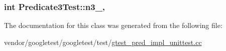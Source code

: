 \subsubsection[{\texorpdfstring{n3\+\_\+}{n3_}}]{\setlength{\rightskip}{0pt plus 5cm}int Predicate3\+Test\+::n3\+\_\+\hspace{0.3cm}{\ttfamily [static]}, {\ttfamily [protected]}}\hypertarget{classPredicate3Test_afc1df6b079ffe22b87479b161d2ad2f7}{}\label{classPredicate3Test_afc1df6b079ffe22b87479b161d2ad2f7}


The documentation for this class was generated from the following file\+:\begin{DoxyCompactItemize}
\item 
vendor/googletest/googletest/test/\hyperlink{gtest__pred__impl__unittest_8cc}{gtest\+\_\+pred\+\_\+impl\+\_\+unittest.\+cc}\end{DoxyCompactItemize}

